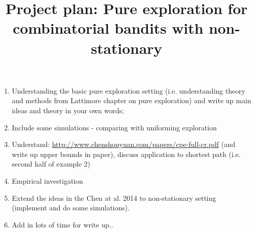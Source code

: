 \documentclass[12pt]{article}
\title{Project plan: Pure exploration for combinatorial bandits with non-stationary}
\author{}
\date{}
\begin{document}
 \maketitle

\begin{enumerate}
    \item Understanding the basic pure exploration setting (i.e. understanding theory and methods from Lattimore chapter on pure exploration) and write up  main ideas and theory in your own words;
    \item Include some simulations - comparing with uniforming exploration
    \item Understand: \url{http://www.chenshouyuan.com/papers/cpe-full-cr.pdf} (and write up upper bounds in paper), discuss application to shortest path (i.e. second half of example 2)
    \item Empirical investigation 
    \item Extend the ideas in the Chen at al. 2014 to non-stationary setting (implement and do some simulations).
    \item Add in lots of time for write up..
\end{enumerate}
\end{document}
